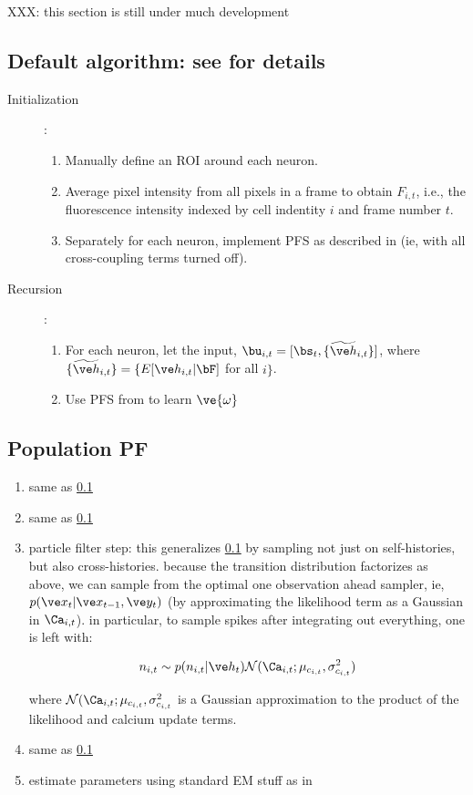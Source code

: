 XXX: this section is still under much development


\subsection{Default algorithm: see \cite{BJ08} for details} \label{sec:default}

\begin{description}
\item[Initialization]: \\
\begin{enumerate}
\item Manually define an ROI around each neuron.
\item Average pixel intensity from all pixels in a frame to obtain $F_{i,t}$, i.e., the fluorescence intensity indexed by cell indentity $i$ and frame number $t$.
\item Separately for each neuron, implement PFS as described in \cite{BJ08} (ie, with all cross-coupling terms turned off). 
\end{enumerate}
\item[Recursion]: \\
\begin{enumerate}
\item For each neuron, let the input, $\bu_{i,t} = [\bs_t, \{\widetilde{\h}_{i,t}\}]$, where $\{\widetilde{\h}_{i,t}\}= \{E[\h_{i,t} | \bF]$ for all $i\}$.
\item Use PFS from \cite{BJ08} to learn $\ve{\omega}$ 
\end{enumerate}
\end{description}

\subsection{Population PF} \label{sec:PopPF}

\begin{enumerate}
\item same as \ref{sec:default}
\item same as \ref{sec:default}
\item particle filter step: this generalizes \ref{sec:default} by sampling not just on self-histories, but also cross-histories.  because the transition distribution factorizes as above, we can sample from the optimal one observation ahead sampler, ie, $p(\x_t | \x_{t-1}, \y_t)$ (by approximating the likelihood term as a Gaussian in $\Ca_{i,t}$). in particular, to sample spikes after integrating out everything, one is left with:

\begin{align}
n_{i,t} \sim p(n_{i,t} | \h_t) \mathcal{N}(\Ca_{i,t}; \mu_{c_{i,t}}, \sigma_{c_{i,t}}^2)
\end{align}  

\noindent where $\mathcal{N}(\Ca_{i,t}; \mu_{c_{i,t}}, \sigma_{c_{i,t}}^2$ is a Gaussian approximation to the product of the likelihood and calcium update terms.  

\item same as \ref{sec:default}
\item estimate parameters using standard EM stuff as in \cite{BJ08}
\end{enumerate}

